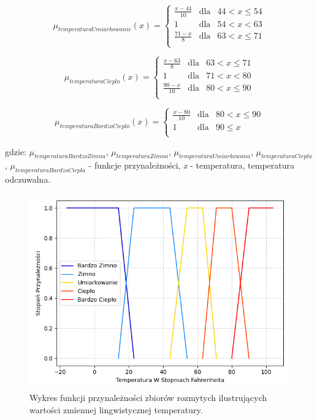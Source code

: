 \documentclass{classrep}
\begin{document}
\begin{equation}
\mu _{temperaturaUmiarkowanie}(x) =  \left\{ \begin{array}{rcl}
\frac{x - 44}{10} & \mbox{dla} & 44 < x \leq 54\\
1 & \mbox{dla} & 54 < x < 63\\
\frac{71 - x}{8} & \mbox{dla} & 63 < x \leq 71\\
\end{array}\right.
\end{equation}

\begin{equation}
\mu _{temperaturaCieplo}(x) =  \left\{ \begin{array}{rcl}
\frac{x - 63}{8} & \mbox{dla} & 63 < x \leq 71\\
1 & \mbox{dla} & 71 < x < 80\\
\frac{90 - x}{10} & \mbox{dla} & 80 < x \leq 90\\
\end{array}\right.
\end{equation}

\begin{equation}
\mu _{temperaturaBardzoCieplo}(x) =  \left\{ \begin{array}{rcl}
\frac{x - 80}{10} & \mbox{dla} & 80 < x \leq 90\\
1 & \mbox{dla} & 90 \leq x\\
\end{array}\right.
\end{equation}

gdzie: \(\mu _{temperaturaBardzoZimna}\), \(\mu _{temperaturaZimna}\), \(\mu _{temperaturaUmiarkowana}\), \(\mu _{temperaturaCiepla}\), \(\mu _{temperaturaBardzoCiepla}\) - funkcje przynależności, \textit{x} - temperatura, temperatura odczuwalna. 


\begin{figure}[h!]
 \centering
 \includegraphics[width=14cm]{FunkcjaPrzynaleznosciTemperatura.png}
 \vspace{-0.3cm}
 \caption{Wykres funkcji przynależności zbiorów rozmytych ilustrujących wartości zmiennej lingwistycznej temperatury. }
 \label{rysunek do eksperymentu 1 wariantu 1}
\end{figure}
\newpage
\end{document}
